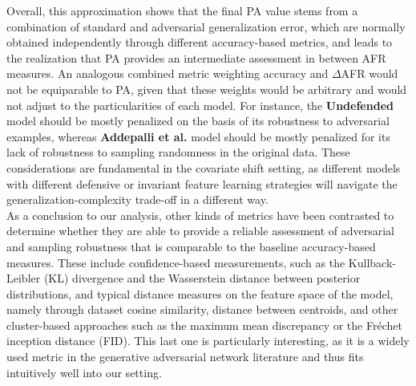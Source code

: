 Overall, this approximation shows that the final PA value stems from a combination of 
standard and adversarial generalization error, which are normally obtained independently through
different accuracy-based metrics, and leads to the realization that PA provides an intermediate
assessment in between AFR measures. An analogous combined metric weighting
accuracy and $\Delta$AFR would not be equiparable to PA, given that these weights would be arbitrary
and would not adjust to the particularities of each model. For instance, the 
{\color{tab:orange} \textbf{Undefended}} model should be mostly penalized on the basis of its
robustness to adversarial examples, whereas {\color{tab:purple} \textbf{Addepalli et al.}}
model should be mostly penalized for its lack of robustness to sampling randomness in the
original data. These considerations are fundamental in the covariate shift setting, as
different models with different defensive or invariant feature learning strategies will
navigate the generalization-complexity trade-off in a different way. \\

As a conclusion to our analysis, other kinds of metrics have been contrasted to determine whether they
are able to provide a reliable assessment of adversarial and sampling robustness that is comparable to
the baseline accuracy-based measures. These include confidence-based measurements,
such as the Kullback-Leibler (KL) divergence and the Wasserstein distance between posterior
distributions, and typical distance measures on the feature space of the model, namely 
through dataset cosine similarity, distance between centroids, and other cluster-based approaches 
such as the maximum mean discrepancy or the Fr\'{e}chet inception distance (FID). This last one is 
particularly interesting, as it is a widely used metric in the generative adversarial network 
literature and thus fits intuitively well into our setting. \\

